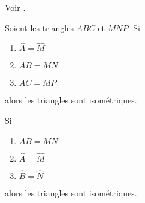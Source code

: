 Voir \cite{TqcjwY}.

\begin{propriete}       \label{PropRtqqxJ}
    Soient les triangles \( ABC\) et \( MNP\). Si
    \begin{enumerate}
        \item
            \( \hat A=\hat M\)
        \item
            \( AB=MN\)
        \item
            \( AC=MP\)
    \end{enumerate}
    alors les triangles sont isométriques.

    Si
    \begin{enumerate}
        \item
            \( AB=MN\)
        \item
            \( \hat A=\hat M\)
        \item
            \( \hat B=\hat N\)
    \end{enumerate}
    alors les triangles sont isométriques.
\end{propriete}
